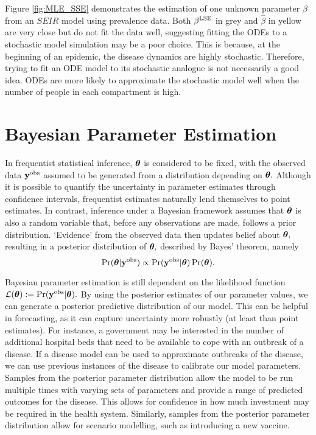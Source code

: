 Figure \ref{fig:MLE_SSE} demonstrates the estimation of one unknown parameter
$\beta$ from an $SEIR$ model
using prevalence data. Both $\beta^{\mathrm{LSE}}$ in grey and $\hat{\beta}$ in yellow
are very close but do
not fit the data well, suggesting fitting the ODEs to a stochastic model
simulation may be a poor choice. This is because, at the beginning of an
epidemic, the disease dynamics are highly stochastic. 
Therefore, trying to fit an ODE model
to its stochastic analogue is not necessarily a good idea. ODEs are more
likely to approximate the stochastic model well when the number of people in
each compartment is high.

\section{Bayesian Parameter Estimation}

In frequentist statistical inference, $\bm{\theta}$ is considered to be
fixed, with the observed data $\mathbf{y}^{\mathrm{obs}}$ assumed to be
generated from a distribution depending on $\bm{\theta}.$ Although it is possible
to quantify the uncertainty in parameter estimates through confidence intervals,
frequentist estimates naturally lend themselves to point estimates.
In contrast, inference under a Bayesian
framework assumes that $\bm{\theta}$ is also a random variable that, before any
observations are made, follows a
prior distribution. `Evidence' from the observed data then updates
belief about
$\bm{\theta},$ resulting in a posterior distribution of $\bm{\theta},$ described by
Bayes' theorem, namely
$$
    \Pr(\bm{\theta}|\mathbf{y}^{\mathrm{obs}}) \propto \Pr(\mathbf{y}^{\mathrm{obs}}|\bm{\theta})\Pr(\bm{\theta}).
$$

Bayesian parameter estimation is still dependent on the likelihood function
$\mathcal{L}(\bm{\theta}) := \Pr(\mathbf{y}^{\mathrm{obs}}|\bm{\theta}).$
By using the posterior estimates of our parameter values, we can generate a
posterior predictive distribution of our model. This can be helpful in 
forecasting, as it can capture uncertainty more robustly (at least than point
estimates).
For instance, a government may be interested in the number of additional
hospital beds that need to be available to cope with an outbreak of a disease.
If a disease model can be used to approximate outbreaks of the disease,
we can use previous instances of the disease to calibrate our model parameters.
Samples from the posterior parameter distribution allow
the model to be run multiple times with varying sets of parameters
and provide a range of predicted outcomes for the disease. This allows for
confidence in how much investment may be required in the health system.
Similarly, samples from the posterior parameter distribution allow for scenario
modelling, such as introducing a new vaccine.


